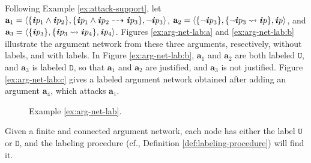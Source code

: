\documentclass[10pt, conference, compsocconf]{IEEEtran}
\begin{document}
\begin{example}\label{ex:arg-net-lab}
Following Example \ref{ex:attack-support}, let $\textbf{a}_{1} = \langle \{ \textbf{\textit{i}}p_{1} \wedge \textbf{\textit{i}}p_{2} \}, \{ \textbf{\textit{i}}p_{1} \wedge \textbf{\textit{i}}p_{2} \dashrightarrow \textbf{\textit{i}}p_{3} \}, \neg\textbf{\textit{i}}p_{3} \rangle$, $\textbf{a}_{2} = \langle \{ \neg\textbf{\textit{i}}p_{3} \}, \{ \neg\textbf{\textit{i}}p_{3} \rightsquigarrow \textbf{\textit{i}}p \}, \textbf{\textit{i}}p \rangle$, and $\textbf{a}_{3} = \langle \{ \textbf{\textit{i}}p_{3} \}, \{ \textbf{\textit{i}}p_{3} \rightsquigarrow \textbf{\textit{i}}p_{4} \}, \textbf{\textit{i}}p_{4} \rangle$. Figures \ref{ex:arg-net-lab:a} and \ref{ex:arg-net-lab:b} illustrate the argument network from these three arguments, resectively, without labels, and with labels. In Figure \ref{ex:arg-net-lab:b}, $\textbf{a}_{1}$ and $\textbf{a}_{2}$ are both labeled $\texttt{U}$, and $\textbf{a}_{3}$ is labeled $\texttt{D}$, so that $\textbf{a}_{1}$ and $\textbf{a}_{2}$ are justified, and $\textbf{a}_{3}$ is not justified. Figure \ref{ex:arg-net-lab:c} gives a labeled argument network obtained after adding an argument $\textbf{a}_{4}$, which attacks $\textbf{a}_{1}$.
\end{example}

\begin{figure}[t]
\centering	{}%
	\qquad
	\qquad
\caption{Example \ref{ex:arg-net-lab}.}
\label{fig:ex:arg-net}
\end{figure}

\begin{proposition}\label{prop:labeling-procedure}
Given a finite and connected argument network, each node has either the label $\texttt{U}$ or $\texttt{D}$, and the labeling procedure (cf., Definition \ref{def:labeling-procedure}) will find it.
\end{proposition}
\end{document}
